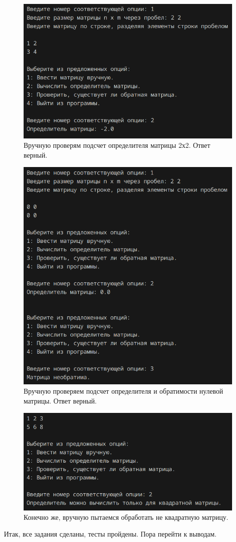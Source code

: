 \begin{figure}[H]
	\centering
	\includegraphics[width=0.5\linewidth]{tests-task10}
	\caption*{Вручную проверям подсчет определителя матрицы 2х2. Ответ верный.}
	\label{fig:tests-task10}
\end{figure}
\begin{figure}[H]
	\centering
	\includegraphics[width=0.5\linewidth]{tests-task11}
	\caption*{Вручную проверяем подсчет определителя и обратимости нулевой матрицы. Ответ верный.}
	\label{fig:tests-task11}
\end{figure}
\begin{figure}[H]
	\centering
	\includegraphics[width=0.5\linewidth]{tests-task12}
	\caption*{Конечно же, вручную пытаемся обработать не квадратную матрицу.}
	\label{fig:tests-task12}
\end{figure}
Итак, все задания сделаны, тесты пройдены. Пора перейти к выводам.


